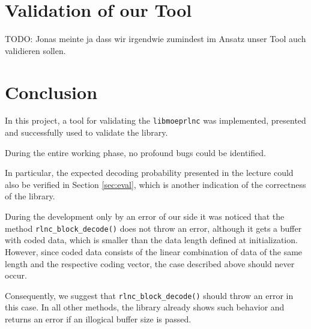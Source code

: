 \documentclass[a4paper,english,10pt]{tumarticle}
\begin{document}
\begin{figure}[htb]
  \hfill
  \caption{}
  \label{fig:hists}
\end{figure}



\section{Validation of our Tool}\label{val}
TODO: Jonas meinte ja dass wir irgendwie zumindest im Ansatz unser Tool auch validieren sollen. 

\section{Conclusion}\label{con}
In this project, a tool for validating the \texttt{libmoeprlnc} was implemented, presented and successfully used 
to validate the library. 

During the entire working phase, no profound bugs could be identified.

In particular, the expected decoding probability presented in the lecture 
could also be verified in Section \ref{sec:eval}, which is another indication of the correctness of the library.

During the development only by an error of our side it was noticed that the method \texttt{rlnc\_block\_decode()} does not 
throw an error, although it gets a buffer with coded data, which is smaller than the data length defined 
at initialization. However, since coded data consists of the linear combination of data of the same length and 
the respective coding vector, the case described above should never occur.

Consequently, we suggest that \texttt{rlnc\_block\_decode()} should throw an error in this case. In all other methods, 
the library already shows such behavior and returns an error if an illogical buffer size is passed.
\end{document}
